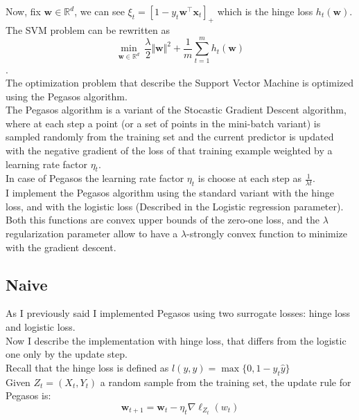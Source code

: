 Now, fix $\boldsymbol{w} \in \mathbb{R}^d$, we can see $\xi_t = \left[1 - y_t \boldsymbol{w}^\top \boldsymbol{x}_t \right]_+$ which is the hinge loss  $h_{t}(\boldsymbol{w})$.\\

The SVM problem can be rewritten as $$\underset{\boldsymbol{w} \in \mathbb{R}^d}{\min} \ \frac{\lambda}{2} \Vert \boldsymbol{w} \Vert^2 + \frac{1}{m} \sum_{t = 1}^m h_{t}(\boldsymbol{w})$$.\\

The optimization problem that describe the Support Vector Machine is optimized using the Pegasos algorithm.\\
The Pegasos algorithm is a variant of the Stocastic Gradient Descent algorithm, where at each step a point (or a set of points in the mini-batch variant) is sampled randomly from the training set
and the current predictor is updated with the negative gradient of the loss of that training example weighted by a learning rate factor $\eta_t$.\\
In case of Pegasos the learning rate factor $\eta_t$ is choose at each step as $\frac{1}{\lambda t}$.\\
I implement the Pegasos algorithm using the standard variant with the hinge loss, and with the logistic loss (Described in the Logistic regression parameter).\\
Both this functions are convex upper bounds of the zero-one loss, and the $\lambda$ regularization parameter allow to have a $\lambda$-strongly convex function to minimize with the gradient descent.\\
\subsection{Naive}
As I previously said I implemented Pegasos using two surrogate losses: hinge loss and logistic loss.\\
Now I describe the implementation with hinge loss, that differs from the logistic one only by the update step.\\ 
Recall that the hinge loss is defined as $l(y, \hat{y}) = \max\{0, 1 - y_t \hat{y}\}$\\
Given $Z_t = (X_t, Y_t)$ a random sample from the training set, the update rule for Pegasos is:\\
$$\boldsymbol{w}_{t+1} = \boldsymbol{w}_t - \eta_t \nabla\ell_{Z_t}(w_t)$$

